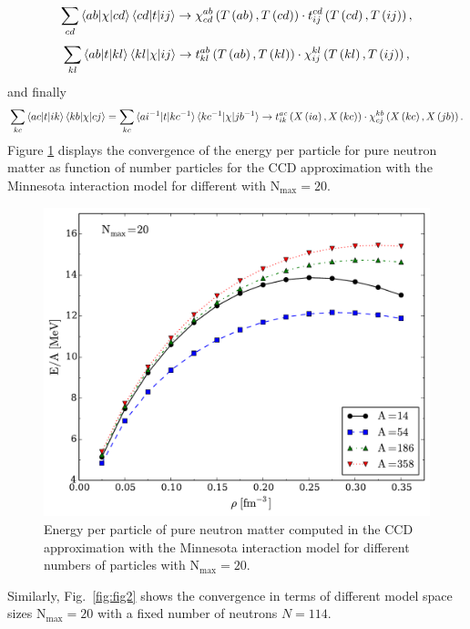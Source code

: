 \[
\sum_{cd} \braket{ab| \chi |cd} \braket{cd| t
    |ij} \rightarrow \chi_{cd}^{ab}\left( T\left( ab\right),T\left(
  cd\right)\right)\cdot t_{ij}^{cd}\left( T\left( cd\right),T\left(
  ij\right)\right),
\] 
\[
\sum_{kl} \braket{ab| t |kl} \braket{kl| \chi |ij} \rightarrow t_{kl}^{ab}\left( T\left( ab\right),T\left(
  kl\right)\right)\cdot \chi_{ij}^{kl}\left( T\left( kl\right),T\left(ij\right)\right),
\]
and finally
\[
\sum_{kc} \braket{ac| t |ik}\braket{kb| \chi
    |cj} = \sum_{kc} \braket{ai^{-1}| t |kc^{-1}}\braket{kc^{-1}| \chi
    |jb^{-1}} \rightarrow t_{ik}^{ac}\left( X\left( ia\right),X\left(
  kc\right)\right)\cdot \chi_{cj}^{kb}\left( X\left( kc\right),X\left(
  jb\right)\right).
\]
Figure \ref{fig:fig1} displays the convergence of the energy per particle for pure neutron matter as function of number particles 
for  the CCD approximation with the Minnesota interaction model  \cite{minnesota} for different with $\mathrm{N_{max}=20}$.
  \begin{figure}
    \includegraphics[width=\linewidth]{Chapter8-figures/fig1.pdf}
    \caption{Energy per particle of pure neutron matter computed in
      the CCD approximation with the Minnesota interaction model  \cite{minnesota} for different
      numbers of particles with $\mathrm{N_{max}=20}$.}
    \label{fig:fig1}
  \end{figure}
Similarly, Fig.~\ref{fig:fig2} shows the convergence in terms of different model space sizes $\mathrm{N_{max}=20}$ with 
a fixed number of neutrons $N=114$. 
